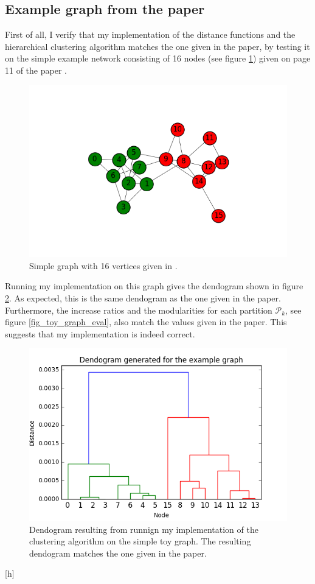 \documentclass[12pt]{article}
\theoremstyle{definition}
\begin{document}
\subsection{Example graph from the paper}
First of all, I verify that my implementation of the distance functions and the hierarchical clustering algorithm matches the one given in the paper, by testing it on the simple example network consisting of 16 nodes (see figure \ref{fig_toy_graph}) given on page 11 of the paper \cite{pons2005computing}.
\begin{figure}
	\includegraphics[scale=0.6]{toy_graph}
	\centering
	\caption{Simple graph with 16 vertices given in \cite{pons2005computing}.}
	\label{fig_toy_graph}
\end{figure}
Running my implementation on this graph gives the dendogram shown in figure \ref{fig_toy_graph_dendogram}. As expected, this is the same dendogram as the one given in the paper. Furthermore, the increase ratios and the modularities for each  partition $\mathcal{P}_k$, see figure \ref{fig_toy_graph_eval}, also match the values given in the paper. This suggests that my implementation is indeed correct.
\begin{figure}[h]
	\includegraphics[scale=0.5]{toy_graph_dendogram}
	\centering
	\caption{Dendogram resulting from runnign my implementation of the clustering algorithm on the simple toy graph. The resulting dendogram matches the one given in the paper.}
	\label{fig_toy_graph_dendogram}
\end{figure}[h]
\end{document}
